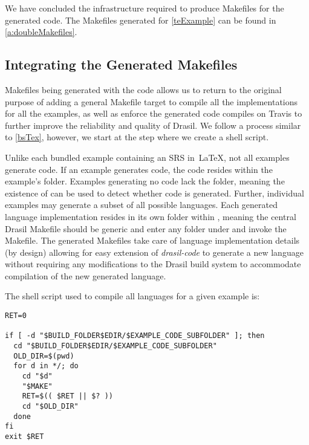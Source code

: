 {{{{{%

We have concluded the infrastructure required to produce Makefiles for the generated code. The Makefiles generated for \autoref{teExample} can be found in \autoref{a:doubleMakefiles}. 

\subsection{Integrating the Generated Makefiles}\label{bsCodeImpl}

Makefiles being generated with the code allows us to return to the original purpose of adding a general Makefile target to compile all the implementations for all the examples, as well as enforce the generated code compiles on Travis to further improve the reliability and quality of Drasil. We follow a process similar to \autoref{bsTex}, however, we start at the step where we create a shell script. 

Unlike each bundled example containing an SRS in\ \LaTeX, not all examples generate code. If an example generates code, the code resides within the example's  folder. Examples generating no code lack the  folder, meaning the existence of  can be used to detect whether code is generated. Further, individual examples may generate a subset of all possible languages. Each generated language implementation resides in its own folder within , meaning the central Drasil Makefile should be generic and enter any folder under  and invoke the Makefile. The generated Makefiles take care of language implementation details (by design) allowing for easy extension of \textit{drasil-code} to generate a new language without requiring any modifications to the Drasil build system to accommodate compilation of the new generated language.

The shell script used to compile all languages for a given example is:

\begin{tcolorbox}
\begin{verbatim}
RET=0

if [ -d "$BUILD_FOLDER$EDIR/$EXAMPLE_CODE_SUBFOLDER" ]; then
  cd "$BUILD_FOLDER$EDIR/$EXAMPLE_CODE_SUBFOLDER"
  OLD_DIR=$(pwd)
  for d in */; do
    cd "$d"
    "$MAKE"
    RET=$(( $RET || $? ))
    cd "$OLD_DIR"
  done
fi
exit $RET
\end{verbatim}
\end{tcolorbox}

}}}}}
